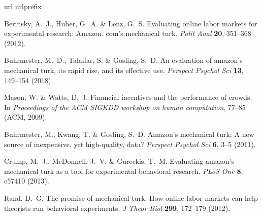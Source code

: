 \documentclass[9pt,a4paper,twocolumn,lineno]{article}
\begin{document}
\begin{thebibliography}{10}\scriptsize
\expandafter\ifx\csname url\endcsname\relax
  \def\url#1{\texttt{#1}}\fi
\expandafter\ifx\csname urlprefix\endcsname\relax\def\urlprefix{URL }\fi
\providecommand{\bibinfo}[2]{#2}
\providecommand{\eprint}[2][]{\url{#2}}


\bibinfo{author}{Berinsky, A.~J.}, \bibinfo{author}{Huber, G.~A.} \&
  \bibinfo{author}{Lenz, G.~S.}
\newblock \bibinfo{title}{Evaluating online labor markets for experimental
  research: Amazon. com's mechanical turk}.
\newblock \emph{\bibinfo{journal}{Polit Anal}} \textbf{\bibinfo{volume}{20}},
  \bibinfo{pages}{351--368} (\bibinfo{year}{2012}).

\bibinfo{author}{Buhrmester, M.~D.}, \bibinfo{author}{Talaifar, S.} \&
  \bibinfo{author}{Gosling, S.~D.}
\newblock \bibinfo{title}{An evaluation of amazon’s mechanical turk, its
  rapid rise, and its effective use}.
\newblock \emph{\bibinfo{journal}{Perspect Psychol Sci}}
  \textbf{\bibinfo{volume}{13}}, \bibinfo{pages}{149--154}
  (\bibinfo{year}{2018}).

\bibinfo{author}{Mason, W.} \& \bibinfo{author}{Watts, D.~J.}
\newblock \bibinfo{title}{Financial incentives and the performance of crowds}.
\newblock In \emph{\bibinfo{booktitle}{Proceedings of the ACM SIGKDD workshop
  on human computation}}, \bibinfo{pages}{77--85} (\bibinfo{organization}{ACM},
  \bibinfo{year}{2009}).

\bibinfo{author}{Buhrmester, M.}, \bibinfo{author}{Kwang, T.} \&
  \bibinfo{author}{Gosling, S.~D.}
\newblock \bibinfo{title}{Amazon's mechanical turk: A new source of
  inexpensive, yet high-quality, data?}
\newblock \emph{\bibinfo{journal}{Perspect Psychol Sci}}
  \textbf{\bibinfo{volume}{6}}, \bibinfo{pages}{3--5} (\bibinfo{year}{2011}).

\bibinfo{author}{Crump, M.~J.}, \bibinfo{author}{McDonnell, J.~V.} \&
  \bibinfo{author}{Gureckis, T.~M.}
\newblock \bibinfo{title}{Evaluating amazon's mechanical turk as a tool for
  experimental behavioral research}.
\newblock \emph{\bibinfo{journal}{PLoS One}} \textbf{\bibinfo{volume}{8}},
  \bibinfo{pages}{e57410} (\bibinfo{year}{2013}).

\bibinfo{author}{Rand, D.~G.}
\newblock \bibinfo{title}{The promise of mechanical turk: How online labor
  markets can help theorists run behavioral experiments}.
\newblock \emph{\bibinfo{journal}{J Theor Biol}}
  \textbf{\bibinfo{volume}{299}}, \bibinfo{pages}{172--179}
  (\bibinfo{year}{2012}).


\end{thebibliography}
\end{document}
